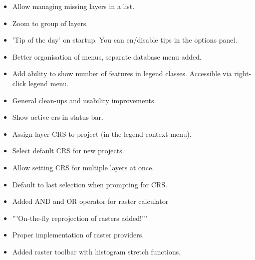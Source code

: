 \begin{itemize}[label=--]
\item Allow managing missing layers in a list.
\item Zoom to group of layers.
\item 'Tip of the day' on startup. You can en/disable tips in the options panel.
\item Better organisation of menus, separate database menu added.
\item Add ability to show number of features in legend classes. Accessible via right-click legend menu.
\item General clean-ups and usability improvements.
\end{itemize}


\begin{itemize}[label=--]
\item Show active crs in status bar.
\item Assign layer CRS to project (in the legend context menu).
\item Select default CRS for new projects.
\item Allow setting CRS for multiple layers at once.
\item Default to last selection when prompting for CRS.
\end{itemize}


\begin{itemize}[label=--]
\item Added AND and OR operator for raster calculator
\item '''On-the-fly reprojection of rasters added!'''
\item Proper implementation of raster providers.
\item Added raster toolbar with histogram stretch functions.
\end{itemize}


